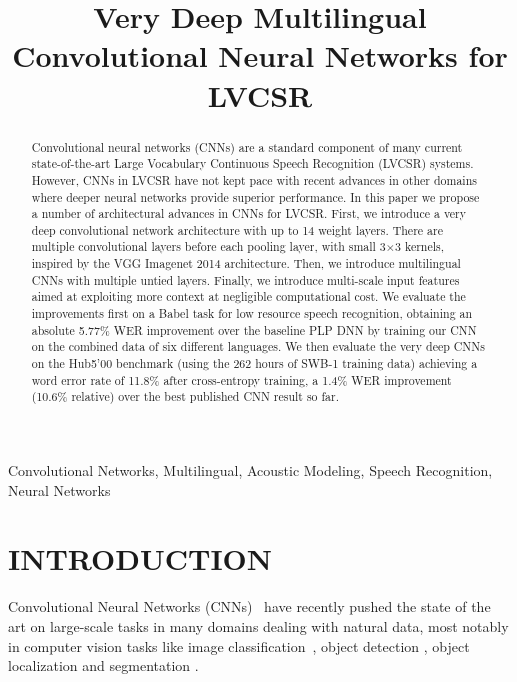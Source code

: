 \documentclass{article}
\title{Very Deep Multilingual Convolutional Neural Networks for LVCSR}
\begin{document}
\ninept
%
\maketitle
%
\begin{abstract}
Convolutional neural networks (CNNs) are a standard component of many current state-of-the-art
Large Vocabulary Continuous Speech Recognition (LVCSR) systems.
However, CNNs in LVCSR have not kept pace with recent advances in other domains where
deeper neural networks provide superior performance.
In this paper we propose a number of architectural advances in CNNs for LVCSR.
First, we introduce a very deep convolutional network architecture with up to 14 weight layers.
There are multiple convolutional layers before each pooling layer, 
with small 3$\times$3 kernels, inspired by the VGG Imagenet 2014 architecture.
Then, we introduce multilingual CNNs with multiple untied layers.
Finally, we introduce multi-scale input features aimed at exploiting more context at negligible computational cost.
We evaluate the improvements first on a Babel task for low resource speech recognition, obtaining an absolute
5.77\% WER improvement over the baseline PLP DNN by training our CNN on the combined data of six different languages.
We then evaluate the very deep CNNs on the Hub5'00 benchmark (using the 262 hours of SWB-1 training data) achieving
a word error rate of 11.8\% after cross-entropy training, 
a 1.4\% WER improvement (10.6\% relative) over the best published CNN result so far.
\end{abstract}
%
\begin{keywords}
Convolutional Networks, Multilingual, Acoustic Modeling, Speech Recognition, Neural Networks
\end{keywords}
%
\section{INTRODUCTION}
\label{sec:intro}

Convolutional Neural Networks (CNNs)~\cite{lecun1998gradient} have recently pushed the state of the art
on large-scale tasks in many domains dealing with natural data,
most notably in computer vision tasks like image classification~\cite{krizhevsky2012imagenet, simonyan2014very},
object detection \cite{sermanet2013pedestrian,girshick2014rich}, object localization \cite{sermanet2013overfeat}
and segmentation \cite{farabet2013learning}.
\end{document}
